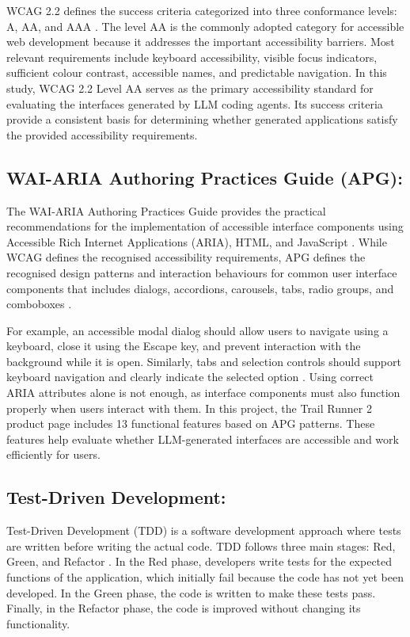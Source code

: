 \documentclass[conference]{IEEEtran}
\begin{document}
WCAG 2.2 defines the success criteria categorized into three conformance levels: A, AA, and AAA \cite{wcag2022}. The level AA is the commonly adopted category for accessible web development because it addresses the important accessibility barriers. Most relevant requirements include keyboard accessibility, visible focus indicators, sufficient colour contrast, accessible names, and predictable navigation. In this study, WCAG 2.2 Level AA serves as the primary accessibility standard for evaluating the interfaces generated by LLM coding agents. Its success criteria provide a consistent basis for determining whether generated applications satisfy the provided accessibility requirements.

\subsection{WAI-ARIA Authoring Practices Guide (APG):}

The WAI-ARIA Authoring Practices Guide provides the practical recommendations for the implementation of accessible interface components using Accessible Rich Internet Applications (ARIA), HTML, and JavaScript \cite{apg2026}. While WCAG defines the recognised accessibility requirements, APG defines the recognised design patterns and interaction behaviours for common user interface components that includes dialogs, accordions, carousels, tabs, radio groups, and comboboxes \cite{apg2026}.

For example, an accessible modal dialog should allow users to navigate using a keyboard, close it using the Escape key, and prevent interaction with the background while it is open. Similarly, tabs and selection controls should support keyboard navigation and clearly indicate the selected option \cite{apg2026}. Using correct ARIA attributes alone is not enough, as interface components must also function properly when users interact with them. In this project, the Trail Runner 2 product page includes 13 functional features based on APG patterns. These features help evaluate whether LLM-generated interfaces are accessible and work efficiently for users.

\subsection{Test-Driven Development:}

Test-Driven Development (TDD) is a software development approach where tests are written before writing the actual code. TDD follows three main stages: Red, Green, and Refactor \cite{mathews2024}. In the Red phase, developers write tests for the expected functions of the application, which initially fail because the code has not yet been developed. In the Green phase, the code is written to make these tests pass. Finally, in the Refactor phase, the code is improved without changing its functionality.
\end{document}
